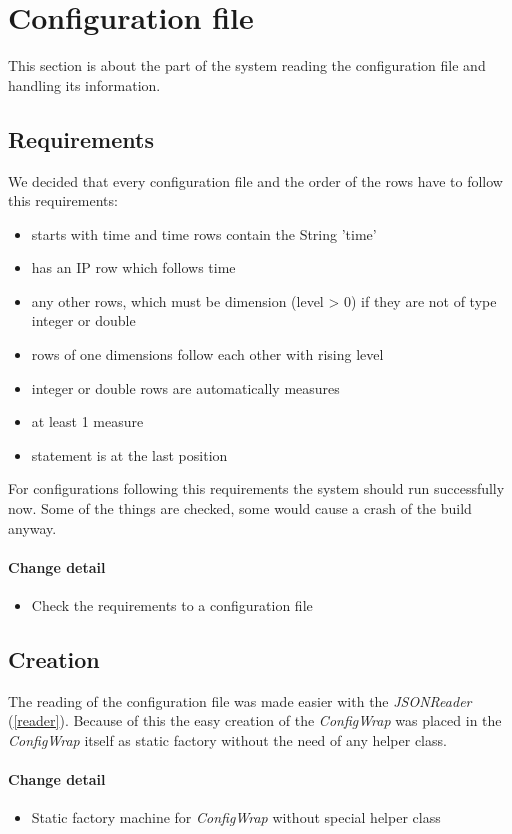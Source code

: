 \section{Configuration file}
This section is about the part of the system reading the configuration file
and handling its information.

\subsection{Requirements}
We decided that every configuration file and the order of the 
rows have to follow this requirements:
\begin{itemize}
  \item starts with time and time rows contain the String 'time'
  \item has an IP row which follows time
  \item any other rows, which must be dimension (level > 0) if they are not of
  type integer or double
  \item rows of one dimensions follow each other with rising level
  \item integer or double rows are automatically measures
  \item at least 1 measure
  \item statement is at the last position
\end{itemize} 

For configurations following this requirements the system should run
successfully now. Some of the things are checked, some would cause a crash
of the build anyway.

\paragraph{Change detail}
\begin{itemize}
  \item Check the requirements to a configuration file
\end{itemize}

\subsection{Creation}
The reading of the configuration file was made easier with the
\textit{JSONReader} (\ref{reader}). Because of this the easy creation
of the \textit{ConfigWrap} was placed in the \textit{ConfigWrap} itself as
static factory without the need of any helper class.

\paragraph{Change detail}
\begin{itemize}
  \item Static factory machine for \textit{ConfigWrap} without special helper class
\end{itemize}

